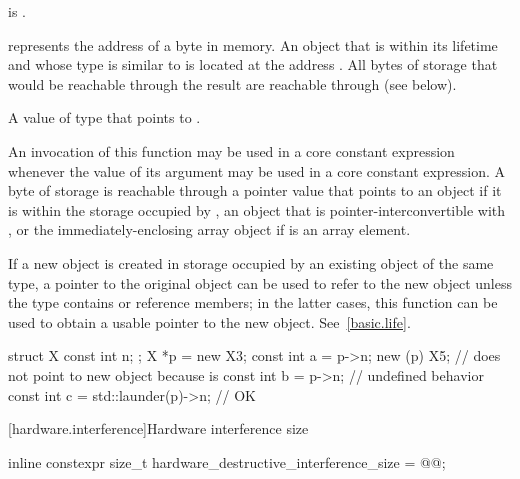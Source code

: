 \begin{itemdescr}
\pnum
\mandates
{} is .

\pnum
\expects
{} represents the address  of a byte in memory.
An object  that is within its lifetime
and whose type is similar to 
is located at the address .
All bytes of storage that would be reachable through the result
are reachable through  (see below).

\pnum
\returns
A value of type  that points to .

\pnum
\remarks
An invocation of this function
may be used in a core constant expression
whenever the value of its argument
may be used in a core constant expression.
A byte of storage is
reachable through a pointer value
that points to an object 
if it is within the storage occupied by
,
an object that is pointer-interconvertible with , or
the immediately-enclosing array object if  is an array element.

\pnum
\begin{note}
If a new object is created
in storage occupied by an existing object of the same type,
a pointer to the original object
can be used to refer to the new object
unless the type contains  or reference members;
in the latter cases,
this function can be used to obtain a usable pointer to the new object.
See~\ref{basic.life}.
\end{note}

\pnum
\begin{example}
\begin{codeblock}
struct X { const int n; };
X *p = new X{3};
const int a = p->n;
new (p) X{5};                       //  does not point to new object because  is 
const int b = p->n;                 // undefined behavior
const int c = std::launder(p)->n;   // OK
\end{codeblock}
\end{example}
\end{itemdescr}

[hardware.interference]{Hardware interference size}

%
\begin{itemdecl}
inline constexpr size_t hardware_destructive_interference_size = @\impdef{}@;
\end{itemdecl}

